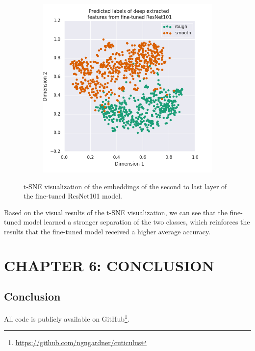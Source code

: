 \documentclass[12pt]{article}
\begin{document}
\begin{figure}[h]
\begin{subfigure}{.45\textwidth}
        \includegraphics[width=1\linewidth]{assets/plots/fresnet101_pred_tsne.png}
    \end{subfigure}
    \caption{t-SNE visualization of the embeddings of the second to last layer of the
        fine-tuned ResNet101 model.}
    \label{fig:fresnet101_tsne}
\end{figure}

Based on the visual results of the t-SNE visualization, we can see that the
fine-tuned model learned a stronger separation of the two classes, which
reinforces the results that the fine-tuned model received a higher average
accuracy.

\clearpage
\section{CHAPTER 6: CONCLUSION}

\subsection{Conclusion}

All code is publicly available on
GitHub\footnote{\href{https://github.com/ngngardner/cuticulus}
    {https://github.com/ngngardner/cuticulus}}.
\end{document}
